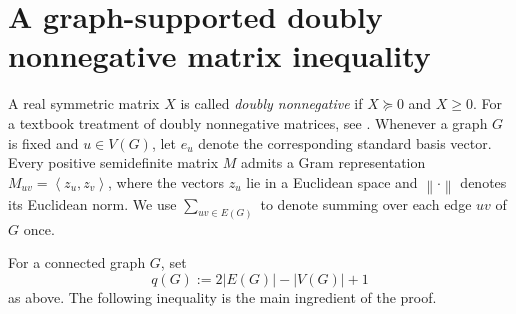 \documentclass[11pt,letterpaper,reqno]{amsart}
\theoremstyle{definition}
\newcommand{\ip}[2]{\left\langle #1,#2\right\rangle}
\newcommand{\norm}[1]{\left\lVert #1\right\rVert}
\begin{document}
\section{A graph-supported doubly nonnegative matrix inequality}\label{sec:sparse}

A real symmetric matrix $X$ is called \emph{doubly nonnegative} if
$X\succeq0$ and $X\ge0$. For a textbook treatment of doubly nonnegative matrices, see \cite{BSM}. Whenever a graph $G$ is fixed and
$u\in V(G)$, let $e_u$ denote the corresponding standard basis vector. Every positive semidefinite matrix $M$ admits a Gram
representation $M_{uv}=\ip{z_u}{z_v}$, where the vectors $z_u$ lie in a Euclidean space and
$\norm{\cdot}$ denotes its Euclidean norm. {\color{red} We use $\sum_{uv \in E(G)}$ to denote summing over each edge $uv$ of $G$ once.}






For a connected graph $G$, set
\[
    q(G):=2|E(G)|-|V(G)|+1
\]
as above. The following
inequality is the main ingredient of the proof.
\end{document}
